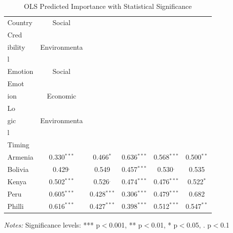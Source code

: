 \begin{table}[htbp]
\centering
\small
\caption{OLS Predicted Importance with Statistical Significance}
\label{tab:ols_importance}
\begin{tabular}{lccccc}
\toprule
Country & Social\\Cred \\[-0.5ex] ibility & Environmenta \\[-0.5ex] l\\Emotion & Social\\Emot \\[-0.5ex] ion & Economic\\Lo \\[-0.5ex] gic & Environmenta \\[-0.5ex] l\\Timing \\
\midrule
 Armenia & 0.330$^{***}$ & 0.466$^{*}$ & 0.636$^{***}$ & 0.568$^{***}$ & 0.500$^{**}$ \\
 Bolivia & 0.429$^{.}$ & 0.549 & 0.457$^{***}$ & 0.530$^{.}$ & 0.535 \\
 Kenya & 0.502$^{***}$ & 0.526$^{.}$ & 0.474$^{***}$ & 0.476$^{***}$ & 0.522$^{*}$ \\
 Peru & 0.605$^{***}$ & 0.428$^{***}$ & 0.306$^{***}$ & 0.479$^{***}$ & 0.682 \\
 Philli & 0.616$^{***}$ & 0.427$^{***}$ & 0.398$^{***}$ & 0.512$^{***}$ & 0.547$^{**}$ \\
\bottomrule
\end{tabular}
\begin{minipage}{\textwidth}
\footnotesize
\textit{Notes:} Significance levels: *** p$<$0.001, ** p$<$0.01, * p$<$0.05, . p$<$0.1
\end{minipage}
\end{table}
